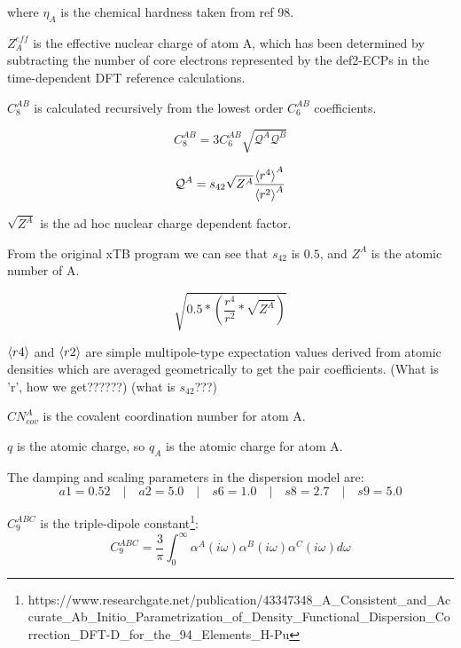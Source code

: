 \noindent
where \(\eta_A\) is the chemical hardness taken from ref 98.

\noindent
\(Z_A^{eff}\) is the effective nuclear charge of atom A, which has been determined by subtracting the number of core electrons represented by the def2-ECPs in the time-dependent DFT reference calculations.



\vspace{10pt}
\noindent
\(C_8^{AB}\) is calculated recursively from the lowest order \(C_6^{AB}\) coefficients.

\begin{equation}
  C_8^{AB} = 3C_6^{AB} \sqrt{\mathcal{Q}^A\mathcal{Q}^B}
\end{equation}

\begin{equation}
  \mathcal{Q}^A = s_{42} \sqrt{Z^A} \frac{\braket{r^4}^A}{\braket{r^2}^A}
\end{equation}


\vspace{10pt}
\noindent
\(\sqrt{Z^A}\) is the ad hoc nuclear charge dependent factor.

From the original xTB program we can see that \(s_{42}\) is \(0.5\), and \(Z^A\) is the atomic number of A.

\begin{equation}
  \sqrt{0.5 * (\frac{r^4}{r^2} * \sqrt{Z^A})}
\end{equation}

\(\braket{r4}\) and \(\braket{r2}\) are simple multipole-type expectation values derived from atomic densities which are averaged geometrically to get the pair coefficients. (What is 'r', how we get??????) (what is \(s_{42}\)???)

\vspace{20pt}
\noindent
\(CN^A_{cov}\) is the covalent coordination number for atom A.

\vspace{10pt}
\noindent
\(q\) is the atomic charge, so \(q_A\) is the atomic charge for atom A.

\vspace{10pt}
\noindent
The damping and scaling parameters in the
dispersion model are:
\[
  a1 = 0.52 \quad|\quad a2 = 5.0 \quad|\quad s6 = 1.0 \quad|\quad s8 = 2.7 \quad|\quad s9 = 5.0
\]


\vspace{10pt}
\noindent
\(C_9^{ABC}\) is the triple-dipole constant\footnote{\label{dft-d}https://www.researchgate.net/publication/43347348\_A\_Consistent\_and\_Accurate\_Ab\_Initio\_Parametrization\_of\_Density\_Functional\_Dispersion\_Correction\_DFT-D\_for\_the\_94\_Elements\_H-Pu}:
\begin{equation}
  C_9^{ABC} = \frac{3}{\pi} \int_0^\infty \alpha^A(i\omega) \alpha^B(i\omega)\alpha^C(i\omega)d\omega
\end{equation}


